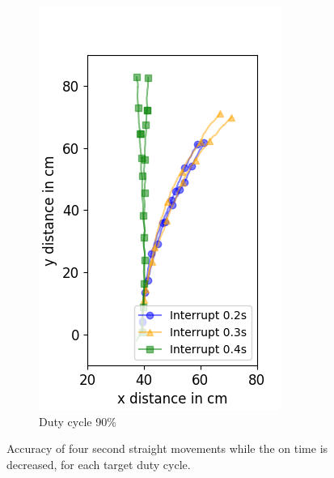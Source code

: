 \begin{figure}
\begin{subfigure}[b]{0.32\textwidth}
		\includegraphics[width=\textwidth]{pics/figure_90.png}
		\caption{Duty cycle 90\%}
		\label{fig:target_90}
	\end{subfigure}
	\caption{Accuracy of four second straight movements while the on time is decreased, for each target duty cycle.}
	\label{fig:decreasing_power_period}
\end{figure}

